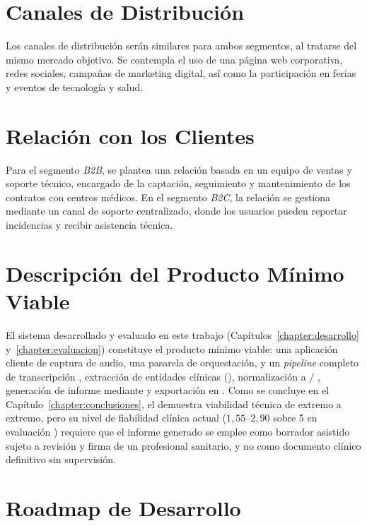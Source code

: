 \section{Canales de Distribución}\label{section:innovacion_canales}

Los canales de distribución serán similares para ambos segmentos, al tratarse del mismo mercado
objetivo. Se contempla el uso de una página web corporativa, redes sociales, campañas de marketing
digital, así como la participación en ferias y eventos de tecnología y salud.

\section{Relación con los Clientes}\label{section:innovacion_relacion_clientes}

Para el segmento \textit{B2B}, se plantea una relación basada en un equipo de ventas y soporte técnico,
encargado de la captación, seguimiento y mantenimiento de los contratos con centros médicos. En el
segmento \textit{B2C}, la relación se gestiona mediante un canal de soporte centralizado, donde los
usuarios pueden reportar incidencias y recibir asistencia técnica.

\section{Descripción del Producto Mínimo Viable}\label{section:innovacion_mvp}

El sistema desarrollado y evaluado en este trabajo (Capítulos~\ref{chapter:desarrollo}
y~\ref{chapter:evaluacion}) constituye el producto mínimo viable: una aplicación cliente de captura de
audio, una pasarela de orquestación, y un \textit{pipeline} completo de transcripción ,
extracción de entidades clínicas (), normalización a /
, generación de informe mediante  y exportación en
. Como se concluye en el Capítulo~\ref{chapter:conclusiones}, el 
demuestra viabilidad técnica de extremo a extremo, pero su nivel de fiabilidad clínica actual
($1{,}55$--$2{,}90$ sobre 5 en evaluación ) requiere que el informe generado se
emplee como borrador asistido sujeto a revisión y firma de un profesional sanitario, y no como
documento clínico definitivo sin supervisión.

\section{Roadmap de Desarrollo}\label{section:innovacion_roadmap}

